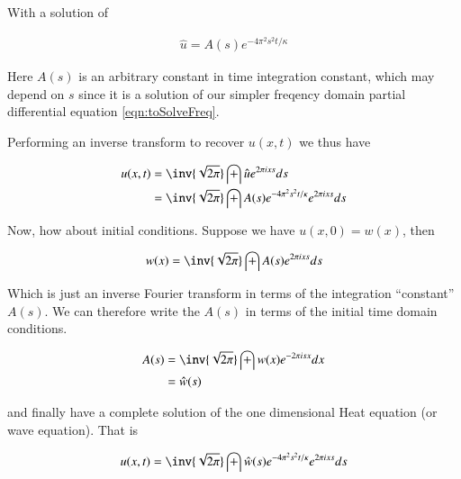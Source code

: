 \documentclass{article}
\begin{document}
With a solution of

\begin{align*}
\hat{u} = A(s) e^{ -4 \pi^2 s^2 t/ \kappa }
\end{align*}

Here $A(s)$ is an arbitrary constant in time integration constant, which may depend on $s$ since it is a solution of our simpler freqency domain partial differential equation
\ref{eqn:toSolveFreq}.

Performing an inverse transform to recover $u(x,t)$ we thus have

\begin{align*}
u(x,t) 
&= \inv{\sqrt{2\pi}} \int \hat{u} e^{2 \pi i x s } ds  \\
&= \inv{\sqrt{2\pi}} \int A(s) e^{ -4 \pi^2 s^2 t/ \kappa } e^{2 \pi i x s } ds  \\
\end{align*}

Now, how about initial conditions.  Suppose we have $u(x,0) = w(x)$, then 

\begin{align*}
w(x) &= \inv{\sqrt{2\pi}} \int A(s) e^{2 \pi i x s } ds \\
\end{align*}

Which is just an inverse Fourier transform in terms of the integration ``constant'' $A(s)$.  We can therefore write the $A(s)$ in terms of the
initial time domain conditions.

\begin{align*}
A(s) &= \inv{\sqrt{2\pi}} \int w(x) e^{-2 \pi i s x } dx \\
&= \hat{w}(s)
\end{align*}

and finally have a complete solution of the one dimensional Heat equation (or wave equation).  That is

\begin{align*}
u(x,t) &= \inv{\sqrt{2\pi}} \int \hat{w}(s) e^{ -4 \pi^2 s^2 t/ \kappa } e^{2 \pi i x s } ds  \\
\end{align*}

%
%
\end{document}
